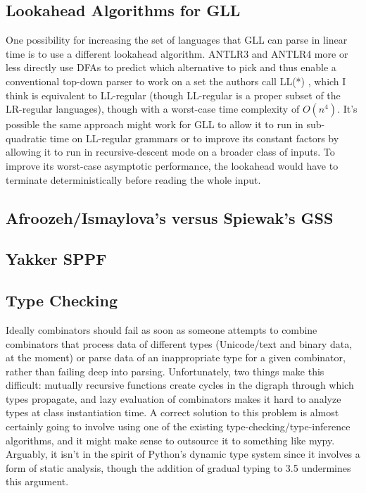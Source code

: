 \documentclass[12pt]{article}
\begin{document}
\subsection{Lookahead Algorithms for GLL}
\label{sec:gll_lookahead}

One possibility for increasing the set of languages that GLL can parse
in linear time is to use a different lookahead algorithm.  ANTLR3 and
ANTLR4 more or less directly use DFAs to predict which alternative to
pick and thus enable a conventional top-down parser to work on a set
the authors call LL(*) \parencites{antlr3, antlr4}, which I think is
equivalent to LL-regular (though LL-regular is a proper subset of the
LR-regular languages\parencite{ll-regular}), though with a worst-case
time complexity of $O(n^4)$.  It's possible the same approach might
work for GLL to allow it to run in sub-quadratic time on LL-regular
grammars or to improve its constant factors by allowing it to run in
recursive-descent mode on a broader class of inputs.  To improve its
worst-case asymptotic performance, the lookahead would have to
terminate deterministically before reading the whole input.


\subsection{Afroozeh/Ismaylova's versus Spiewak's GSS}
\label{sec:gss_details}


\subsection{Yakker SPPF}
\label{sec:yakker_sppf}


\subsection{Type Checking}
\label{sec:type_checking}

Ideally combinators should fail as soon as someone attempts to combine
combinators that process data of different types (Unicode/text and
binary data, at the moment) or parse data of an inappropriate type for
a given combinator, rather than failing deep into parsing.
Unfortunately, two things make this difficult: mutually recursive
functions create cycles in the digraph through which types propagate,
and lazy evaluation of combinators makes it hard to analyze types at
class instantiation time.  A correct solution to this problem is
almost certainly going to involve using one of the existing
type-checking/type-inference algorithms, and it might make sense to
outsource it to something like mypy.  Arguably, it isn't in the spirit
of Python's dynamic type system since it involves a form of static
analysis, though the addition of gradual typing to 3.5 undermines this
argument.
\end{document}
